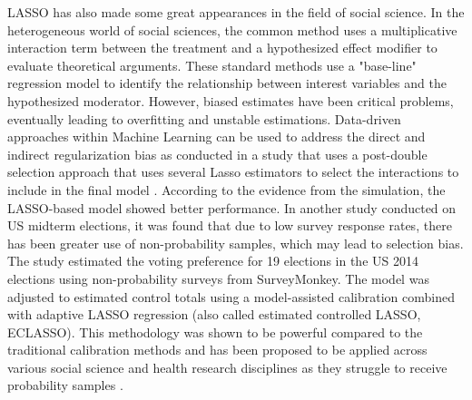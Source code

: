 LASSO has also made some great appearances in the field of social science. In the heterogeneous world of social sciences, the common method uses a multiplicative interaction term between the treatment and a hypothesized effect modifier to evaluate theoretical arguments. These standard methods use a "base-line" regression model to identify the relationship between interest variables and the hypothesized moderator. However, biased estimates have been critical problems, eventually leading to overfitting and unstable estimations. Data-driven approaches within Machine Learning can be used to address the direct and indirect regularization bias as conducted in a study that uses a post-double selection approach that uses several Lasso estimators to select the interactions to include in the final model \cite{blackwell2020reducing}. According to the evidence from the simulation, the LASSO-based model showed better performance.  In another study conducted on US midterm elections, it was found that due to low survey response rates,  there has been greater use of non-probability samples, which may lead to selection bias. The study estimated the voting preference for 19 elections in the US 2014 elections using non-probability surveys from SurveyMonkey. The model was adjusted to estimated control totals using a model-assisted calibration combined with adaptive LASSO regression (also called estimated controlled LASSO, ECLASSO). This methodology was shown to be powerful compared to the traditional calibration methods and has been proposed to be applied across various social science and health research disciplines as they struggle to receive probability samples \cite{chen2019calibrating}.

